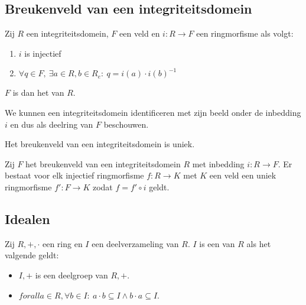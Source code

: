 \documentclass[main.tex]{subfiles}
\begin{document}
\subsection{Breukenveld van een integriteitsdomein}
\label{sec:breukenveld-van-een-integriteitsdomein}

\begin{de}
  Zij $R$ een integriteitsdomein, $F$ een veld en $i: R \rightarrow F$ een ringmorfisme als volgt:
  \begin{enumerate}
  \item $i$ is injectief
  \item $\forall q \in F,\ \exists a \in R, b\in R_{e}:\ q = i(a)\cdot i(b)^{-1}$
  \end{enumerate}
  $F$ is dan het  van $R$.
\end{de}

\begin{st}
  We kunnen een integriteitsdomein identificeren met zijn beeld onder de inbedding $i$ en dus als deelring van $F$ beschouwen.
\end{st}

\begin{ei}
  Het breukenveld van een integriteitsdomein is uniek.
\end{ei}

\begin{ei}
  Zij $F$ het breukenveld van een integriteitsdomein $R$ met inbedding $i: R \rightarrow F$.
  Er bestaat voor elk injectief ringmorfisme $f: R \rightarrow K$ met $K$ een veld een uniek ringmorfisme $f': F \rightarrow K$ zodat $f = f' \circ i$ geldt.
\end{ei}

\subsection{Idealen}
\label{sec:idealen}


\begin{de}
  Zij $R,+,\cdot$ een ring en $I$ een deelverzameling van $R$.
  $I$ is een  van $R$ als het valgende geldt:
  \begin{itemize}
  \item $I,+$ is een deelgroep van $R,+$.
  \item $forall a \in R, \forall b \in I:\ a\cdot b \subseteq I \wedge b\cdot a \subseteq I$. 
  \end{itemize}
\end{de}
\end{document}
